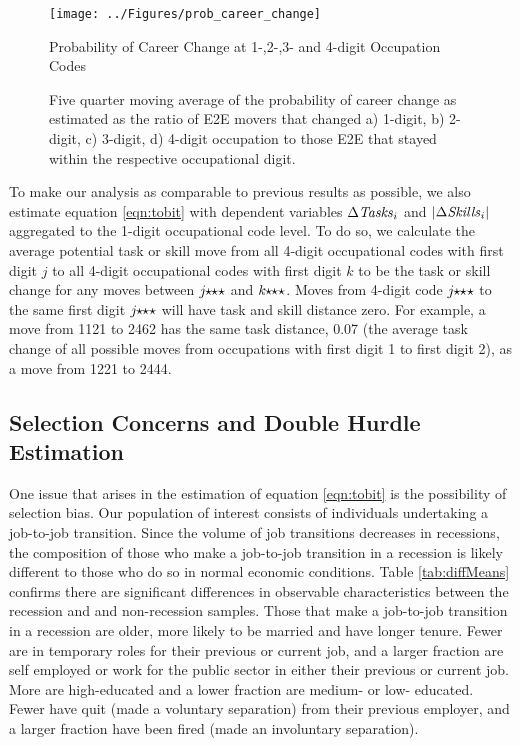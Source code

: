 \documentclass[11pt, oneside]{article}
\begin{document}
\begin{figure}[h]
	\centering
	\texttt{[image: ../Figures/prob\_career\_change]}
	\caption{Probability of Career Change at 1-,2-,3- and 4-digit Occupation Codes}
	\caption*{\small{Five quarter moving average of the probability of career change as estimated as the ratio of E2E movers that changed a) 1-digit, b) 2-digit, c) 3-digit, d) 4-digit occupation to those E2E that stayed within the respective occupational digit.}}
	\label{fig:probCareerChange}
\end{figure}

To make our analysis as comparable to previous results as possible, we also estimate equation \ref{eqn:tobit} with dependent variables  $\Delta\text{\textit{Tasks}}_{i}$ and $|\Delta\text{\textit{Skills}}_{i}|$ aggregated to the 1-digit occupational code level. To do so, we calculate the average potential task or skill move from all 4-digit occupational codes with first digit $j$ to all 4-digit occupational codes with first digit $k$ to be the task or skill change for any moves between $j\hspace{-1mm}\star\hspace{-1mm}\star\star$ and $k\hspace{-1mm}\star\hspace{-1mm}\star\star$. Moves from 4-digit code $j\hspace{-1mm}\star\hspace{-1mm}\star\star$ to the same first digit $j\hspace{-1mm}\star\hspace{-1mm}\star\star$ will have task and skill distance zero. For example, a move from 1121 to 2462 has the same task distance, 0.07 (the average task change of all possible moves from occupations with first digit 1 to first digit 2), as a move from 1221 to 2444.

\subsection{Selection Concerns and Double Hurdle Estimation}
\label{sec:selection}

One issue that arises in the estimation of equation \ref{eqn:tobit}  is the possibility of selection bias. Our population of interest consists of individuals undertaking a job-to-job transition. Since the volume of job transitions decreases in recessions, the composition of those who make a job-to-job transition in a recession is likely different to those who do so in normal economic conditions. Table \ref{tab:diffMeans} confirms there are significant differences in observable characteristics between the recession and and non-recession samples. Those that make a job-to-job transition in a recession are older, more likely to be married and have longer tenure. Fewer are in temporary roles for their previous or current job, and a larger fraction are self employed or work for the public sector in either their previous or current job. More are high-educated and a lower fraction are medium- or low- educated. Fewer have quit (made a voluntary separation) from their previous employer, and a larger fraction have been fired (made an involuntary separation).  
\end{document}
